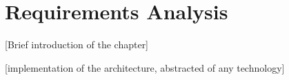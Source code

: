 \chapter{Requirements Analysis}
 [Brief introduction of the chapter]

 [implementation of the architecture, abstracted of any technology]



